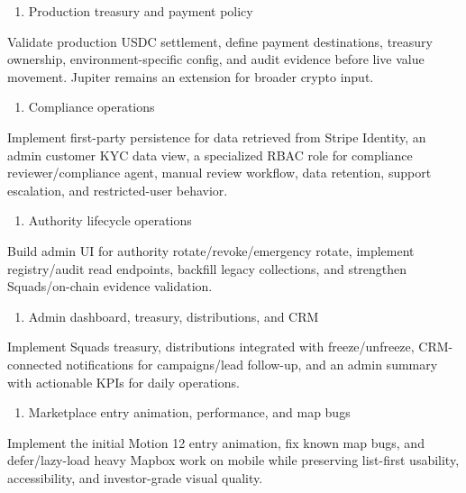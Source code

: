 \documentclass[
  10pt,
  letterpaper,
]{article}
\providecommand{\tightlist}{%
  \setlength{\itemsep}{0pt}\setlength{\parskip}{0pt}}
\begin{document}
\begin{enumerate}
\def\labelenumi{\arabic{enumi}.}
\setcounter{enumi}{2}
\tightlist
\item
  Production treasury and payment policy
\end{enumerate}

Validate production USDC settlement, define payment destinations,
treasury ownership, environment-specific config, and audit evidence
before live value movement. Jupiter remains an extension for broader
crypto input.

\begin{enumerate}
\def\labelenumi{\arabic{enumi}.}
\setcounter{enumi}{3}
\tightlist
\item
  Compliance operations
\end{enumerate}

Implement first-party persistence for data retrieved from Stripe
Identity, an admin customer KYC data view, a specialized RBAC role for
compliance reviewer/compliance agent, manual review workflow, data
retention, support escalation, and restricted-user behavior.

\begin{enumerate}
\def\labelenumi{\arabic{enumi}.}
\setcounter{enumi}{4}
\tightlist
\item
  Authority lifecycle operations
\end{enumerate}

Build admin UI for authority rotate/revoke/emergency rotate, implement
registry/audit read endpoints, backfill legacy collections, and
strengthen Squads/on-chain evidence validation.

\begin{enumerate}
\def\labelenumi{\arabic{enumi}.}
\setcounter{enumi}{5}
\tightlist
\item
  Admin dashboard, treasury, distributions, and CRM
\end{enumerate}

Implement Squads treasury, distributions integrated with
freeze/unfreeze, CRM-connected notifications for campaigns/lead
follow-up, and an admin summary with actionable KPIs for daily
operations.

\begin{enumerate}
\def\labelenumi{\arabic{enumi}.}
\setcounter{enumi}{6}
\tightlist
\item
  Marketplace entry animation, performance, and map bugs
\end{enumerate}

Implement the initial Motion 12 entry animation, fix known map bugs, and
defer/lazy-load heavy Mapbox work on mobile while preserving list-first
usability, accessibility, and investor-grade visual quality.
\end{document}

